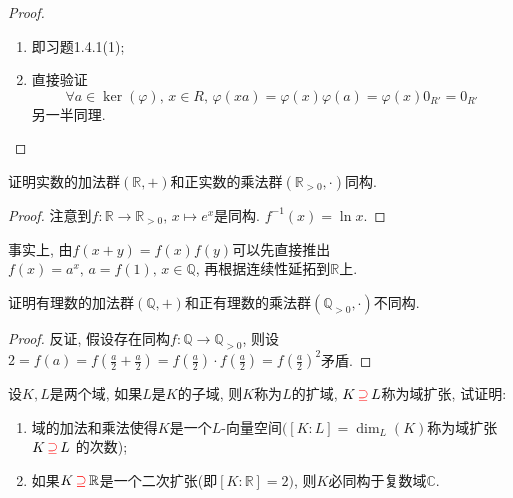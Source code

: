 \documentclass{../solutions-cn}
\begin{document}
\begin{proof}
    \begin{enumerate}[(1)]
        \item 即习题1.4.1(1);
        \item 直接验证
        \[
            \forall a \in \ker(\varphi),\, x \in R,\, \varphi(xa) = \varphi(x)\varphi(a) = \varphi(x)0_{R'} = 0_{R'}
        \]
        另一半同理.
    \end{enumerate}
\end{proof}

\begin{exercise}[习题1.4.5]
    证明实数的加法群$(\mathbb{R}, +)$和正实数的乘法群$(\mathbb{R}_{>0}, \cdot)$同构.
\end{exercise}

\begin{proof}
    注意到$f: \mathbb{R} \to \mathbb{R}_{>0},\, x \mapsto e^x$是同构. $f^{-1}(x) = \ln x$.
\end{proof}

\begin{remark}
    事实上, 由$f(x + y) = f(x)f(y)$可以先直接推出$f(x) = a^x,\, a = f(1),\, x \in \mathbb{Q}$, 再根据连续性延拓到$\mathbb{R}$上.
\end{remark}

\begin{exercise}[习题1.4.6]
    证明有理数的加法群$(\mathbb{Q}, +)$和正有理数的乘法群$(\mathbb{Q}_{>0}, \cdot)$不同构.
\end{exercise}

\begin{proof}
    反证, 假设存在同构$f: \mathbb{Q} \to \mathbb{Q}_{>0}$, 则设$2 = f(a) = f(\frac{a}{2} + \frac{a}{2}) = f(\frac{a}{2}) \cdot f(\frac{a}{2}) = f(\frac{a}{2})^2$矛盾.
\end{proof}

\begin{exercise}[习题1.4.9]
    设$K, L$是两个域, 如果$L$是$K$的子域, 则$K$称为$L$的扩域, $K \,\textcolor{red}{\supseteq}\, L$称为域扩张, 试证明:
    \begin{enumerate}[(1)]
        \item 域的加法和乘法使得$K$是一个$L$-向量空间$([K:L] = \dim_L(K)$称为域扩张$K \,\textcolor{red}{\supseteq}\, L$ 的次数);
        \item 如果$K \,\textcolor{red}{\supseteq}\, \mathbb{R}$是一个二次扩张(即$[K:\mathbb{R}] = 2)$, 则$K$必同构于复数域$\mathbb{C}$.
    \end{enumerate}
\end{exercise}
\end{document}
